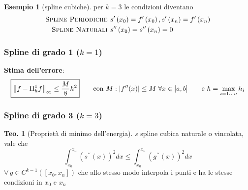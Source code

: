 \documentclass[a4paper,10pt]{article}
\theoremstyle{definition}
\theoremstyle{indentdefinition}
\theoremstyle{indenttheorem}
\newtheorem{thm}{Teo.}
\theoremstyle{myremark}
\newtheorem{example*}{Esempio}
\theoremstyle{indentgeneral}
\theoremstyle{plain}
\theoremstyle{plain}
\newenvironment{myboxed} 
{\noindent\begin{lrbox}{\mybox}\begin{minipage}{\textwidth}}
{\end{minipage}\end{lrbox}\fbox{\usebox{\mybox}}}
\begin{document}
\begin{example*}[spline cubiche] per $k=3$ le condizioni diventano
  \begin{align*}
\textsc{Spline Periodiche } & s^{\prime}\left(x_{0}\right)=f^{\prime}\left(x_{0}\right),s^{\prime}\left(x_{n}\right)=f^{\prime}\left(x_{n}\right) \\
\textsc{Spline Naturali } & s^{\prime\prime}\left(x_{0}\right)=s^{\prime\prime}\left(x_{n}\right)=0
\end{align*}

\end{example*}

\subsubsection{Spline di grado 1 ($k=1$)}
\textbf{Stima dell'errore}:
$$\boxed{\norm{f-\Pi_h^1f}_\infty\le \frac{M}{8}h^2}\qquad \text{con }M: \abs{f''(x)}\le M \;\forall x\in[a,b] \qquad \text{e }h=\max_{i=1\dots n}h_i$$
\subsubsection{Spline di grado 3 ($k=3$)}

\begin{myboxed}
\begin{thm}[Proprietà di minimo dell'energia]
$s$ spline cubica naturale o vincolata, vale che $$\int_{x_{0}}^{x_{n}}\left(s^{\prime\prime}\left(x\right)\right)^{2}dx\leq\int_{x_{0}}^{x_{n}}\left(g^{\prime\prime}\left(x\right)\right)^{2}dx$$
$\forall\,g\in C^{k-1}\left(\left[x_{0},x_{n}\right]\right)$ che
allo stesso modo interpola i punti e ha le stesse condizioni in $x_{0}$
e $x_{n}$
\end{thm}
\end{myboxed}
\end{document}
